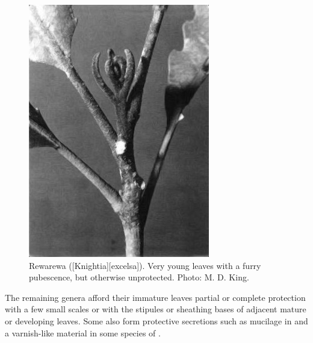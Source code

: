 \begin{figure}[!b]
\begin{minipage}[t]{\textwidth}
\begin{minipage}[t]{(\textwidth-\fgap) * \real{0.32}}
			\includegraphics[width=\textwidth]{graphics/fig_025}
			\caption[Rewarewa leaves]{Rewarewa ([Knightia][excelsa]).
			Very young leaves with a furry pubescence, but otherwise unprotected.
			Photo: M. D. King.}%
			\label{fig:25rewarewa}
		\end{minipage}
	\end{minipage}
\end{figure}

The remaining genera afford their immature leaves partial or complete protection with a few small scales or with the stipules or sheathing bases of adjacent mature or developing leaves.
Some also form protective secretions such as mucilage in  and a varnish-like material in some species of .
